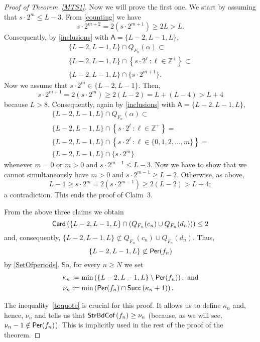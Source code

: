\documentclass[a4paper, 11pt]{amsart}
\numberwithin{equation}{section}
\theoremstyle{customnumberedtheorem}
\theoremstyle{definitionwithbfnote}
\newcommand{\Z}{\ensuremath{\mathbb{Z}}}
\DeclareMathOperator{\sbc}{\textsf{\upshape StrBdCof\,}}
\DeclareMathOperator{\Per}{\textsf{\upshape Per}}
\DeclareMathOperator{\Card}{\textsf{\upshape Card}}
\DeclareMathOperator{\Succ}{\textsf{\upshape Succ}}
\newcommand{\succs}[1]{\ensuremath{\Succ\left(#1\right)}}
\newcommand{\set}[2]{\ensuremath{\left\{#1 \,\colon #2\right\}}}
\begin{document}
\begin{proof}[Proof of Theorem~\ref{MTS1}]
Now we will prove the first one.
We start by assuming that $s \cdot 2^m \le L-3.$
From \eqref{counting} we have
\[
 s \cdot 2^{m+2} = 2 \left(s \cdot 2^{m+1} \right) \ge 2L > L.
\]
Consequently, by \eqref{inclusions} with $\mathsf{A} = \{L-2, L-1, L\},$
\begin{multline*}
  \{L-2, L-1, L\} \cap Q_{F_n}(\alpha) \subset \\
      \{L-2, L-1, L\} \cap \set{s \cdot 2^\ell}{\ell\in\Z^+} \subset \\
      \{L-2, L-1, L\} \cap \{s \cdot 2^{m+1}\}.
\end{multline*}
Now we assume that $s \cdot 2^m \in \{L-2, L-1\}.$
Then,
\[
 s \cdot 2^{m+1} = 2 \left(s \cdot 2^m \right) \ge 2(L-2) = L + (L-4) > L + 4
\]
because $L > 8.$
Consequently, again by \eqref{inclusions} with $\mathsf{A} = \{L-2, L-1, L\},$
\begin{multline*}
  \{L-2, L-1, L\} \cap Q_{F_n}(\alpha) \subset \\
      \{L-2, L-1, L\} \cap \set{s \cdot 2^\ell}{\ell\in\Z^+} = \\
      \{L-2, L-1, L\} \cap \set{s \cdot 2^\ell}{\ell\in\{0,1,2,\dots,m\}} = \\
      \{L-2, L-1, L\} \cap \{s \cdot 2^m\}
\end{multline*}
whenever $m=0$ or $m > 0 $ and $s \cdot 2^{m-1} \le L-3.$
Now we have to show that we cannot simultaneously have
$m > 0$ and $s \cdot 2^{m-1} \ge L-2.$
Otherwise, as above,
\[
  L-1 \ge s \cdot 2^m = 2\left(s \cdot 2^{m-1}\right) \ge 2(L-2) > L + 4;
\]
a contradiction.
This ends the proof of Claim~3.

From the above three claims we obtain
\begin{equation}\label{toquote}
  \Card\left(\{L-2, L-1, L\} \cap \left( Q_{F_n}(c_n) \cup Q_{F_n}(d_n)\right)\right) \le 2
\end{equation}
and, consequently, $\{L-2, L-1, L\} \not\subset Q_{F_n}(c_n) \cup Q_{F_n}(d_n).$
Thus,
\[
   \{L-2, L-1, L\} \not\subset \Per(f_n)
\]
by \eqref{SetOfperiods}. So, for every $n \ge N$ we set
\begin{align*}
 \kappa_n & := \min \left( \{L-2, L-1, L\} \setminus \Per(f_n) \right),\text{ and}\\
 \nu_n & := \min \left( \Per(f_n) \cap \succs{\kappa_n + 1} \right).
\end{align*}

The inequality~\eqref{toquote} is crucial for this
proof. It allows us to define
$\kappa_n$ and, hence, $\nu_n$ and tells us that $\sbc(f_n) \ge \nu_n$
(because, as we will see, $\nu_n - 1 \notin \Per(f_n)$).
This is implicitly used in the rest of the proof of the theorem.


\end{proof}
\end{document}
